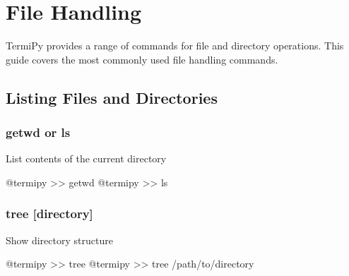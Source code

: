 \documentclass[
  letterpaper,
  DIV=11,
  numbers=noendperiod]{scrreprt}
\newenvironment{Shaded}{\begin{snugshade}}{\end{snugshade}}
\newcommand{\ExtensionTok}[1]{\textcolor[rgb]{0.00,0.23,0.31}{#1}}
\newcommand{\NormalTok}[1]{\textcolor[rgb]{0.00,0.23,0.31}{#1}}
\newcommand{\OperatorTok}[1]{\textcolor[rgb]{0.37,0.37,0.37}{#1}}
\begin{document}

\chapter*{File Handling}\label{file-handling}


TermiPy provides a range of commands for file and directory operations.
This guide covers the most commonly used file handling commands.

\section*{Listing Files and
Directories}\label{listing-files-and-directories}


\subsection*{getwd or ls}\label{getwd-or-ls}

List contents of the current directory

\begin{Shaded}
\begin{Highlighting}[]
\ExtensionTok{@termipy} \OperatorTok{\textgreater{}\textgreater{}}\NormalTok{ getwd}
\ExtensionTok{@termipy} \OperatorTok{\textgreater{}\textgreater{}}\NormalTok{ ls}
\end{Highlighting}
\end{Shaded}

\subsection*{tree {[}directory{]}}\label{tree-directory}

Show directory structure

\begin{Shaded}
\begin{Highlighting}[]
\ExtensionTok{@termipy} \OperatorTok{\textgreater{}\textgreater{}}\NormalTok{ tree}
\ExtensionTok{@termipy} \OperatorTok{\textgreater{}\textgreater{}}\NormalTok{ tree /path/to/directory}
\end{Highlighting}
\end{Shaded}
\end{document}
